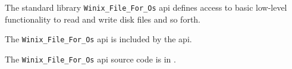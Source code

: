 
The standard library {\tt Winix\_File\_For\_Os} api defines access to basic low-level 
functionality to read and write disk files and so forth.

The {\tt Winix\_File\_For\_Os} api is included by the  api.

The {\tt Winix\_File\_For\_Os} api source code is in .
